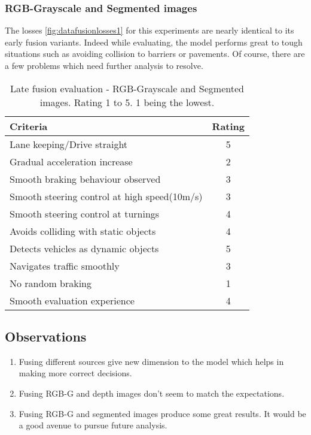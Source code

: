 \subsubsection*{RGB-Grayscale and Segmented images}
The losses \ref{fig:datafusionlosses1} for this experiments are nearly identical to its early fusion variants.
Indeed while evaluating, the model performs great to tough situations such as avoiding
collision to barriers or pavements. Of course, there are a few problems which need further
analysis to resolve.
\begin{table}[!ht]
    \centering
\begin{tabular}{lc}
    \toprule
    Criteria & Rating \\\midrule
    Lane keeping/Drive straight  & 5  \\
    Gradual acceleration increase  & 2\\
    Smooth braking behaviour observed & 3 \\
    Smooth steering control at high speed(10m/s) & 3 \\
    Smooth steering control at turnings & 4\\
    Avoids colliding with static objects & 4 \\
    Detects vehicles as dynamic objects & 5 \\
    Navigates traffic smoothly & 3\\
    No random braking & 1 \\
    Smooth evaluation experience & 4 \\\bottomrule
\end{tabular}
\caption{Late fusion evaluation - RGB-Grayscale and Segmented images. Rating 1 to 5. 1
being the lowest.}
\label{table:latefusionrgbseg}
\end{table}
\subsection*{Observations}
\begin{enumerate}
    \item Fusing different sources give new dimension to the model which helps in making
        more correct decisions.
    \item Fusing RGB-G and depth images don't seem to match the expectations.
    \item Fusing RGB-G and segmented images produce some great results. It would be a
        good avenue to pursue future analysis.
\end{enumerate}
